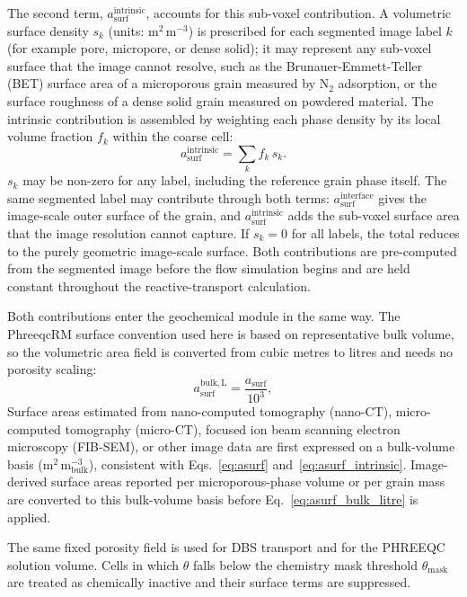 The second term, $a_{\mathrm{surf}}^{\mathrm{intrinsic}}$, accounts for this
sub-voxel contribution. A volumetric surface density $s_k$
(units: m$^2$\,m$^{-3}$) is prescribed for each segmented image label $k$
(for example pore, micropore, or dense solid); it may
represent any sub-voxel surface that the image cannot resolve, such as the
Brunauer-Emmett-Teller (BET) surface area of a microporous grain measured by
N$_2$ adsorption, or the surface roughness of a dense solid grain measured on
powdered material.
The intrinsic contribution is assembled by weighting each phase density by
its local volume fraction $f_k$ within the coarse cell:
\begin{equation}
a_{\mathrm{surf}}^{\mathrm{intrinsic}} = \sum_k f_k\,s_k.
\label{eq:asurf_intrinsic}
\end{equation}
$s_k$ may be non-zero for any label, including the reference grain phase
itself. The same segmented label may contribute through both terms:
$a_{\mathrm{surf}}^{\mathrm{interface}}$ gives the image-scale outer surface
of the grain, and $a_{\mathrm{surf}}^{\mathrm{intrinsic}}$ adds the
sub-voxel surface area that the image resolution cannot capture. If
$s_k = 0$ for all labels, the total reduces to the purely geometric
image-scale surface. Both contributions are pre-computed from the segmented image
before the flow simulation begins and are held constant throughout the
reactive-transport calculation.

Both contributions enter the geochemical module in the same way. The PhreeqcRM
surface convention used here is based on representative bulk volume, so the
volumetric area field is converted from cubic metres to litres and needs no
porosity scaling:
\begin{equation}
a_{\mathrm{surf}}^{\mathrm{bulk,L}} = \frac{a_{\mathrm{surf}}}{10^{3}},
\label{eq:asurf_bulk_litre}
\end{equation}
Surface areas estimated from nano-computed tomography
(nano-CT), micro-computed tomography (micro-CT), focused ion beam scanning
electron microscopy (FIB-SEM), or other image data are first expressed on a
bulk-volume basis (m$^2$\,m$^{-3}_{\mathrm{bulk}}$), consistent with
Eqs.~\eqref{eq:asurf} and~\eqref{eq:asurf_intrinsic}. Image-derived surface areas
reported per microporous-phase volume or per grain mass are converted to this
bulk-volume basis before Eq.~\eqref{eq:asurf_bulk_litre} is applied.

The same fixed porosity field is used for DBS transport and for the PHREEQC
solution volume. Cells in
which $\theta$ falls below the chemistry mask threshold
$\theta_{\mathrm{mask}}$ are treated as chemically inactive and their surface
terms are suppressed.

